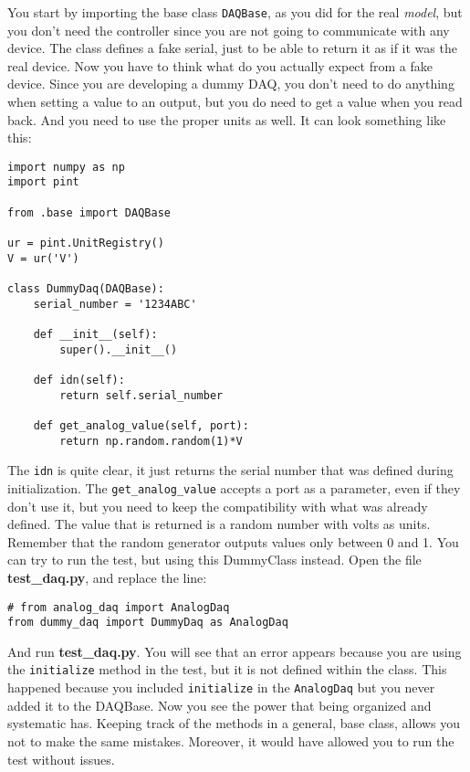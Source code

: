 You start by importing the base class \texttt{DAQBase}, as you did for
the real \emph{model}, but you don't need the controller since you are
not going to communicate with any device. The class defines a fake
serial, just to be able to return it as if it was the real device. Now
you have to think what do you actually expect from a fake device. Since
you are developing a dummy {DAQ}, you don't need to do anything when
setting a value to an output, but you do need to get a value when you
read back. And you need to use the proper units as well. It can look
something like this:

\begin{verbatim}
import numpy as np
import pint

from .base import DAQBase

ur = pint.UnitRegistry()
V = ur('V')

class DummyDaq(DAQBase):
    serial_number = '1234ABC'
    
    def __init__(self):
        super().__init__()
    
    def idn(self):
        return self.serial_number
    
    def get_analog_value(self, port):
        return np.random.random(1)*V
\end{verbatim}

The \texttt{idn} is quite clear, it just returns the serial number that
was defined during initialization. The \texttt{get_analog_value}
accepts a port as a parameter, even if they don't use it, but you need
to keep the compatibility with what was already defined. The value that
is returned is a random number with volts as units. Remember that the
random generator outputs values only between 0 and 1. You can try to run
the test, but using this DummyClass instead. Open the file
\textbf{test\_daq.py}, and replace the line:

\begin{verbatim}
# from analog_daq import AnalogDaq
from dummy_daq import DummyDaq as AnalogDaq
\end{verbatim}

And run \textbf{test\_daq.py}. You will see that an error appears
because you are using the \texttt{initialize} method in the test, but it
is not defined within the class. This happened because you included
\texttt{initialize} in the
\texttt{AnalogDaq} but you never added it to the DAQBase.
Now you see the power that being organized and systematic has. Keeping
track of the methods in a general, base class, allows you not to make
the same mistakes. Moreover, it would have allowed you to run the test
without issues.


